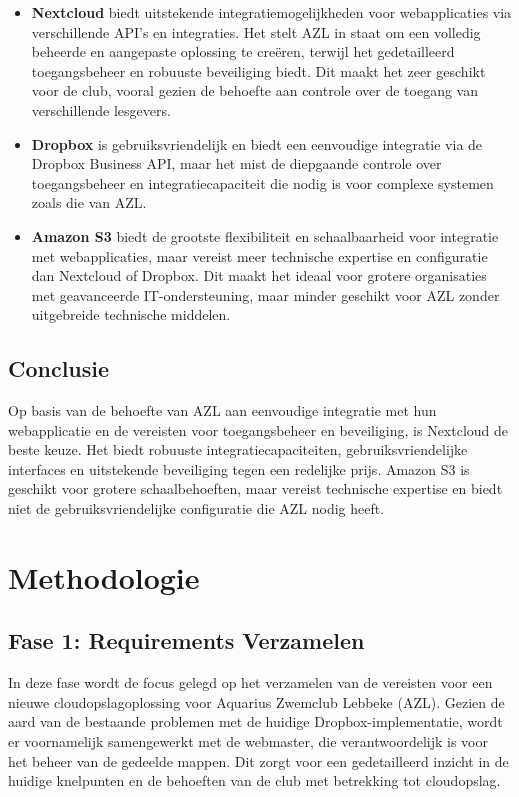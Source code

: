 \begin{itemize}
    \item \textbf{Nextcloud} biedt uitstekende integratiemogelijkheden voor webapplicaties via verschillende API's en integraties. Het stelt AZL in staat om een volledig beheerde en aangepaste oplossing te creëren, terwijl het gedetailleerd toegangsbeheer en robuuste beveiliging biedt. Dit maakt het zeer geschikt voor de club, vooral gezien de behoefte aan controle over de toegang van verschillende lesgevers.
    \item \textbf{Dropbox} is gebruiksvriendelijk en biedt een eenvoudige integratie via de Dropbox Business API, maar het mist de diepgaande controle over toegangsbeheer en integratiecapaciteit die nodig is voor complexe systemen zoals die van AZL.
    \item \textbf{Amazon S3} biedt de grootste flexibiliteit en schaalbaarheid voor integratie met webapplicaties, maar vereist meer technische expertise en configuratie dan Nextcloud of Dropbox. Dit maakt het ideaal voor grotere organisaties met geavanceerde IT-ondersteuning, maar minder geschikt voor AZL zonder uitgebreide technische middelen.
\end{itemize}

\subsection{Conclusie}
Op basis van de behoefte van AZL aan eenvoudige integratie met hun webapplicatie en de vereisten voor toegangsbeheer en beveiliging, is Nextcloud de beste keuze. Het biedt robuuste integratiecapaciteiten, gebruiksvriendelijke interfaces en uitstekende beveiliging tegen een redelijke prijs. Amazon S3 is geschikt voor grotere schaalbehoeften, maar vereist technische expertise en biedt niet de gebruiksvriendelijke configuratie die AZL nodig heeft.
\section{Methodologie}%
\label{sec:methodologie}

\subsection{Fase 1: Requirements Verzamelen}
In deze fase wordt de focus gelegd op het verzamelen van de vereisten voor een nieuwe cloudopslagoplossing voor Aquarius Zwemclub Lebbeke (AZL). Gezien de aard van de bestaande problemen met de huidige Dropbox-implementatie, wordt er voornamelijk samengewerkt met de webmaster, die verantwoordelijk is voor het beheer van de gedeelde mappen. Dit zorgt voor een gedetailleerd inzicht in de huidige knelpunten en de behoeften van de club met betrekking tot cloudopslag.

